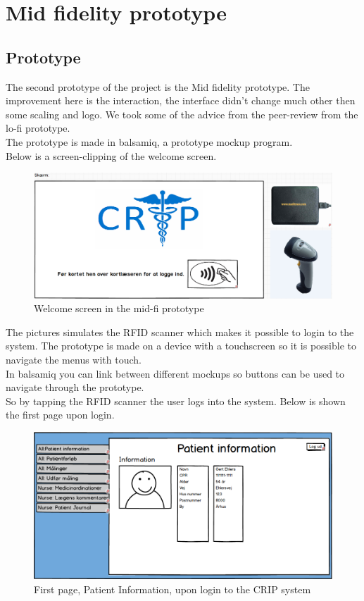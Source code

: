 \chapter{Mid fidelity prototype}

\section{Prototype}
The second prototype of the project is the Mid fidelity prototype. The improvement here is the interaction, the interface didn't change much other then some scaling and logo. We took some of the advice from the peer-review from the lo-fi prototype.\\
The prototype is made in balsamiq, a prototype mockup program.\\
Below is a screen-clipping of the welcome screen.
\begin{figure}[H]
\centering
\includegraphics[width=.9\textwidth]{billeder/WelcomeScreen_MidFi}
\caption{Welcome screen in the mid-fi prototype}
\end{figure}
The pictures simulates the RFID scanner which makes it possible to login to the system. The prototype is made on a device with a touchscreen so it is possible to navigate the menus with touch.\\
In balsamiq you can link between different mockups so buttons can be used to navigate through the prototype.\\
So by tapping the RFID scanner the user logs into the system. Below is shown the first page upon login.\\
\begin{figure}[H]
\centering
\includegraphics[width=.9\textwidth]{billeder/PatientInformation_MidFi}
\caption{First page, Patient Information, upon login to the CRIP system}
\end{figure}
